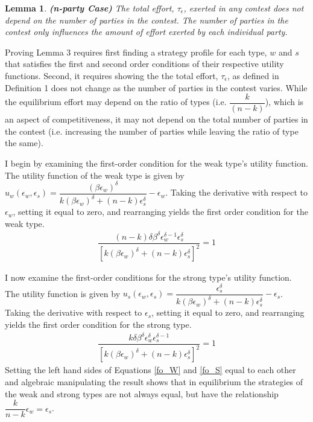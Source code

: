 \documentclass[12pt]{article}
\newtheorem{lemma}{Lemma}
\begin{document}
\begin{appendix}
\begin{lemma}
\textbf{(n-party Case)} The total effort, $\tau_\epsilon$, exerted in any contest does not depend on the number of parties in the contest. The number of parties in the contest only influences the amount of effort exerted by each individual party.
\end{lemma}
Proving Lemma 3 requires first finding a strategy profile for each type, $w$ and $s$ that satisfies the first and second order conditions of their respective utility functions. Second, it requires showing the the total effort, $\tau_\epsilon$, as defined in Definition 1 does not change as the number of parties in the contest varies. While the equilibrium effort may depend on the ratio of types (i.e. $\dfrac{k}{(n-k)}$), which is an aspect of competitiveness, it may not depend on the total number of parties in the contest (i.e. increasing the number of parties while leaving the ratio of type the same).

I begin by examining the first-order condition for the weak type's utility function. The utility function of the weak type is given by $u_w(\epsilon_w, \epsilon_s) = \dfrac{(\beta \epsilon_w)^\delta}{k(\beta \epsilon_w)^\delta + (n-k)\epsilon_s^\delta} - \epsilon_w$. Taking the derivative with respect to $\epsilon_w$, setting it equal to zero, and rearranging yields the first order condition for the weak type.
\begin{align}
\dfrac{(n-k)\delta\beta^\delta\epsilon_w^{\delta-1}\epsilon_s^\delta}{[k(\beta\epsilon_w)^\delta + (n-k)\epsilon_s^\delta]^2} = 1\label{fo_W}
\end{align}

I now examine the first-order conditions for the strong type's utility function. The utility function is given by $u_s(\epsilon_w, \epsilon_s) = \dfrac{\epsilon_s^\delta}{k(\beta \epsilon_w)^\delta + (n-k)\epsilon_s^\delta} - \epsilon_s$. Taking the derivative with respect to $\epsilon_s$, setting it equal to zero, and rearranging yields the first order condition for the strong type.
\begin{align}
\dfrac{k\delta\beta^\delta\epsilon_w^{\delta}\epsilon_s^{\delta-1}}{[k(\beta\epsilon_w)^\delta + (n-k)\epsilon_s^\delta]^2} = 1\label{fo_S}
\end{align}
Setting the left hand sides of Equations \ref{fo_W} and \ref{fo_S} equal to each other and algebraic manipulating the result shows that in equilibrium the strategies of the weak and strong types are not always equal, but have the relationship $\dfrac{k}{n-k}\epsilon_w = \epsilon_s$. 


\end{appendix}
\end{document}
